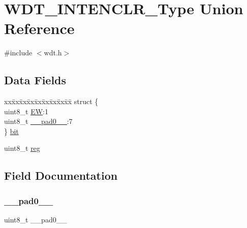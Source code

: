 \hypertarget{union_w_d_t___i_n_t_e_n_c_l_r___type}{}\section{W\+D\+T\+\_\+\+I\+N\+T\+E\+N\+C\+L\+R\+\_\+\+Type Union Reference}
\label{union_w_d_t___i_n_t_e_n_c_l_r___type}


{\ttfamily \#include $<$wdt.\+h$>$}

\subsection*{Data Fields}
\begin{DoxyCompactItemize}
\item 
\begin{tabbing}
xx\=xx\=xx\=xx\=xx\=xx\=xx\=xx\=xx\=\kill
struct \{\\
\>uint8\_t \mbox{\hyperlink{union_w_d_t___i_n_t_e_n_c_l_r___type_a187628158e640ab75b63af25c00d9ba7}{EW}}:1\\
\>uint8\_t \mbox{\hyperlink{union_w_d_t___i_n_t_e_n_c_l_r___type_a8b4eebe79ded0459acec2f4950102ba3}{\_\_pad0\_\_}}:7\\
\} \mbox{\hyperlink{union_w_d_t___i_n_t_e_n_c_l_r___type_a1f260a989c893f1e2fafc3e4807b5978}{bit}}\\

\end{tabbing}\item 
uint8\+\_\+t \mbox{\hyperlink{union_w_d_t___i_n_t_e_n_c_l_r___type_a9428adc9af4653a2050e2536b55dec8d}{reg}}
\end{DoxyCompactItemize}


\subsection{Field Documentation}
\mbox{\label{union_w_d_t___i_n_t_e_n_c_l_r___type_a8b4eebe79ded0459acec2f4950102ba3}} 
\subsubsection{\texorpdfstring{\_\_pad0\_\_}{\_\_pad0\_\_}}
{\footnotesize\ttfamily uint8\+\_\+t \+\_\+\+\_\+pad0\+\_\+\+\_\+}

